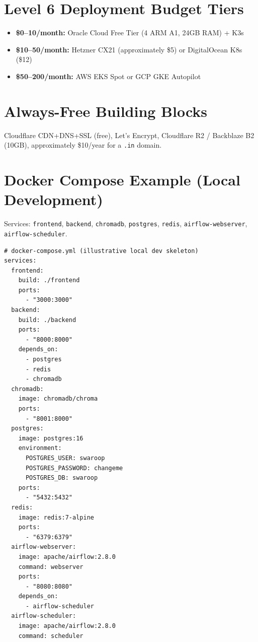 \documentclass{article}
\begin{document}
\section{Level 6 Deployment Budget Tiers}

\begin{itemize}[leftmargin=*]
  \item \textbf{\$0--10/month:} Oracle Cloud Free Tier (4 ARM A1, 24GB RAM) + K3s
  \item \textbf{\$10--50/month:} Hetzner CX21 (approximately \$5) or DigitalOcean K8s (\$12)
  \item \textbf{\$50--200/month:} AWS EKS Spot or GCP GKE Autopilot
\end{itemize}

\section{Always-Free Building Blocks}

Cloudflare CDN+DNS+SSL (free), Let's Encrypt, Cloudflare R2 / Backblaze B2 (10GB), approximately \$10/year for a \texttt{.in} domain.

\section{Docker Compose Example (Local Development)}

Services: \texttt{frontend}, \texttt{backend}, \texttt{chromadb}, \texttt{postgres}, \texttt{redis}, \texttt{airflow-webserver}, \texttt{airflow-scheduler}.

\begin{lstlisting}[language=dockercompose, caption={Illustrative local dev skeleton (\texttt{docker-compose.yml})}]
# docker-compose.yml (illustrative local dev skeleton)
services:
  frontend:
    build: ./frontend
    ports:
      - "3000:3000"
  backend:
    build: ./backend
    ports:
      - "8000:8000"
    depends_on:
      - postgres
      - redis
      - chromadb
  chromadb:
    image: chromadb/chroma
    ports:
      - "8001:8000"
  postgres:
    image: postgres:16
    environment:
      POSTGRES_USER: swaroop
      POSTGRES_PASSWORD: changeme
      POSTGRES_DB: swaroop
    ports:
      - "5432:5432"
  redis:
    image: redis:7-alpine
    ports:
      - "6379:6379"
  airflow-webserver:
    image: apache/airflow:2.8.0
    command: webserver
    ports:
      - "8080:8080"
    depends_on:
      - airflow-scheduler
  airflow-scheduler:
    image: apache/airflow:2.8.0
    command: scheduler
\end{lstlisting}
\end{document}
